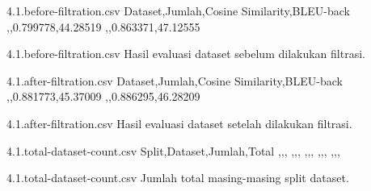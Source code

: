 \begin{filecontents*}{4.1.before-filtration.csv}
  Dataset,Jumlah,Cosine Similarity,BLEU-back
  ,,0.799778,44.28519
  ,,0.863371,47.12555
\end{filecontents*}
  {4.1.before-filtration.csv}
  {Hasil evaluasi dataset sebelum dilakukan filtrasi.}

\begin{filecontents*}{4.1.after-filtration.csv}
  Dataset,Jumlah,Cosine Similarity,BLEU-back
  ,,0.881773,45.37009
  ,,0.886295,46.28209
\end{filecontents*}
  {4.1.after-filtration.csv}
  {Hasil evaluasi dataset setelah dilakukan filtrasi.}

\begin{filecontents*}{4.1.total-dataset-count.csv}
  Split,Dataset,Jumlah,Total
  ,,,
  ,,,
  ,,,
  ,,,
  ,,,
\end{filecontents*}
  {4.1.total-dataset-count.csv}
  {Jumlah total masing-masing split dataset.}
